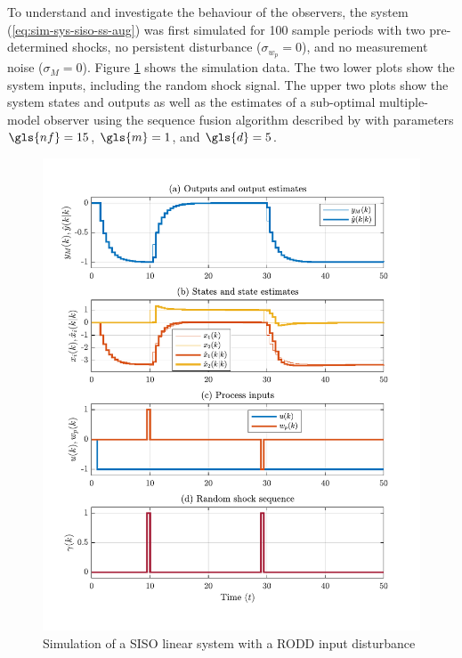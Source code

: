 To understand and investigate the behaviour of the observers, the system (\ref{eq:sim-sys-siso-ss-aug}) was first simulated for 100 sample periods with two pre-determined shocks, no persistent disturbance ($\sigma_{w_p}=0$), and no measurement noise ($\sigma_M=0$). Figure \ref{fig:rod-obs-sim-test-ioplot-SF95} shows the simulation data. The two lower plots show the system inputs, including the random shock signal. The upper two plots show the system states and outputs as well as the estimates of a sub-optimal multiple-model observer using the sequence fusion algorithm described by \cite{robertson_detection_1995} with parameters $\gls{nf}=15$, $\gls{m}=1$, and $\gls{d}=5$.
\begin{figure}[htp]
	\centering
	\includegraphics[width=13cm]{images/rod_MKF_SF_test_sim_MKF_SF95_ioplot.pdf}
	\caption{Simulation of a SISO linear system with a \gls{RODD} input disturbance}
	\label{fig:rod-obs-sim-test-ioplot-SF95}
\end{figure}


